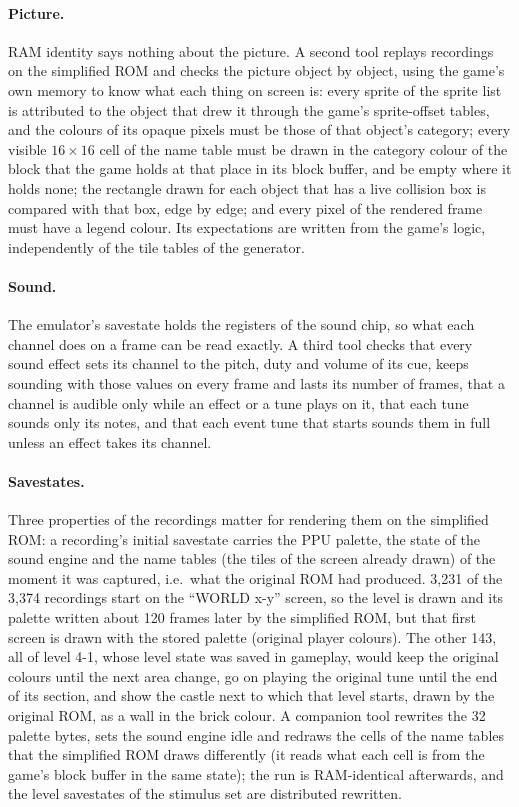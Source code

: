 \documentclass{article}
\begin{document}
\paragraph{Picture.} RAM identity says nothing about the picture. A second tool replays recordings
on the simplified ROM and checks the picture object by object, using the game's own memory to know
what each thing on screen is: every sprite of the sprite list is attributed to the object that
drew it through the game's sprite-offset tables, and the colours of its opaque pixels must be those
of that object's category; every visible $16\times16$ cell of the name table must be drawn in the
category colour of the block that the game holds at that place in its block buffer, and be empty
where it holds none; the rectangle drawn for each object that has a live collision box is compared
with that box, edge by edge; and every pixel of the rendered frame must have a legend colour. Its
expectations are written from the game's logic, independently of the tile tables of the generator.

\paragraph{Sound.} The emulator's savestate holds the registers of the sound chip, so what each
channel does on a frame can be read exactly. A third tool checks that every sound effect sets its
channel to the pitch, duty and volume of its cue, keeps sounding with those values on every frame
and lasts its number of frames, that a channel is audible only while an effect or a tune plays on
it, that each tune sounds only its notes, and that each event tune that starts sounds them in
full unless an effect takes its channel.

\paragraph{Savestates.} Three properties of the recordings matter for rendering them on the
simplified ROM: a recording's initial savestate carries the PPU palette, the state of the sound
engine and the name tables (the tiles of the screen already drawn) of the moment it was captured,
i.e.\ what the original ROM had produced. 3{,}231 of the 3{,}374 recordings start on the
``WORLD x-y'' screen, so the level is drawn and its palette written about 120 frames later by
the simplified ROM, but that first screen is drawn with the stored palette (original player
colours). The other 143, all of level 4-1, whose level state was saved in gameplay, would keep the
original colours until the next area change, go on playing the original tune until the end of its
section, and show the castle next to which that level starts, drawn by the original ROM, as a wall
in the brick colour. A companion tool rewrites the 32 palette bytes, sets the sound engine idle
and redraws the cells of the name tables that the simplified ROM draws differently (it reads what
each cell is from the game's block buffer in the same state); the run is RAM-identical afterwards,
and the level savestates of the stimulus set are distributed rewritten.
\end{document}

